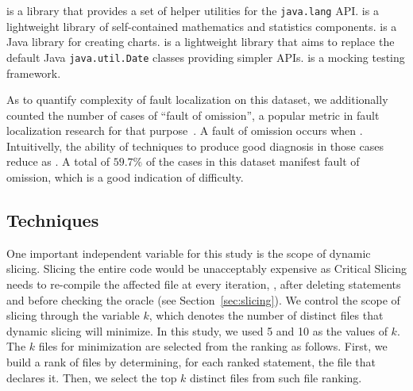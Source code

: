 \documentclass{article}
\begin{document}
\lang{} is a
library that provides a set of helper utilities for the
{\small\texttt{java.lang}} API. \cmath{} is a lightweight library of
self-contained mathematics and statistics components. \chart{}
is a Java library for creating charts.  \jtime{} is a lightweight
library that aims to replace the default Java
{\small\texttt{java.util.Date}} classes providing simpler
APIs. \mockito{} is a mocking testing framework.



As to quantify complexity of fault localization on this dataset, we
additionally counted the number of cases of ``fault of omission'', a
popular metric in fault localization research for that
purpose~. A fault of omission occurs when
. Intuitivelly, the ability of techniques to
produce good diagnosis in those cases reduce as . A
total of $59.7\%$ of the cases in this dataset manifest fault of
omission, which is a good indication of difficulty.



\subsection{Techniques}
One important independent variable for this study is the scope of
dynamic slicing. Slicing the entire code would be unacceptably
expensive as Critical Slicing needs to re-compile the affected file at
every iteration, \ie{}, after deleting statements and before checking
the oracle (see Section~\ref{sec:slicing}). We control the scope of
slicing through the variable $k$, which denotes the number of distinct
files that dynamic slicing will minimize. In this study, we used 5 and
10 as the values of $k$. The $k$ files for minimization are selected
from the \sfl{} ranking as follows. First, we build a rank of files by
determining, for each ranked statement, the file that declares
it. Then, we select the top $k$ distinct files from such file ranking.
\end{document}

